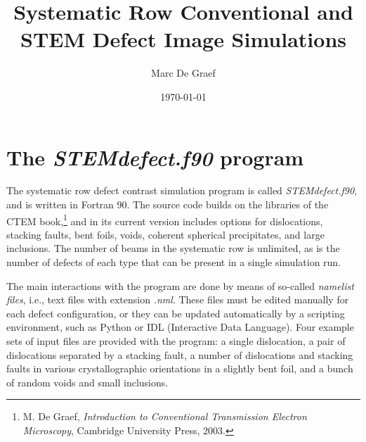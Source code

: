 \documentclass[11pt]{article}
\title{Systematic Row Conventional and STEM Defect Image Simulations}
\author{Marc De Graef}
\date{\today}                                           %
\begin{document}
\maketitle


\section{The \textit{STEMdefect.f90} program}
The systematic row defect contrast simulation program is called \textit{STEMdefect.f90}, and is written in Fortran 90.
The source code builds on the libraries of the CTEM book,\footnote{M. De Graef, \textit{Introduction to Conventional Transmission Electron Microscopy}, Cambridge University Press, 2003.}
and in its current version includes options for dislocations, stacking faults,
bent foils, voids, coherent spherical precipitates, and large inclusions.  The number of beams in the systematic row is unlimited,
as is the number of defects of each type that can be present in a single simulation run.

The main interactions with the program are done by means of so-called \textit{namelist files}, i.e., text files with extension \textit{.nml}.
These files must be edited manually for each defect configuration, or they can be updated automatically by a scripting environment, such as Python or IDL (Interactive Data Language).  
Four example sets of input files are provided with the program:
a single dislocation, a pair of dislocations separated by a stacking fault, a number of dislocations and stacking faults in various 
crystallographic orientations in a slightly bent foil, and a bunch of random voids and small inclusions.  
\end{document}
